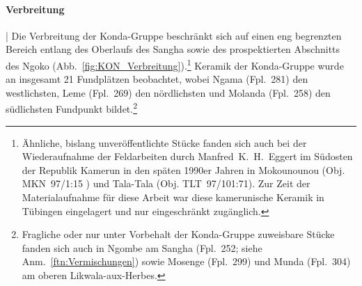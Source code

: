 \paragraph{Verbreitung}\hspace{-.5em}|\hspace{.5em}%
Die Verbreitung der Konda-Gruppe beschränkt sich auf einen eng begrenzten Bereich entlang des Oberlaufs des \mbox{Sangha} sowie des prospektierten Abschnitts des \mbox{Ngoko} (Abb.~\ref{fig:KON_Verbreitung}).\footnote{Ähnliche, bislang unveröffentlichte Stücke fanden sich auch bei der Wiederaufnahme der Feldarbeiten durch Manfred~K.~H.~Eggert im Südosten der Republik Kamerun in den späten 1990er Jahren \parencite[siehe][]{Eggert.2002} in Mokounounou (Obj. MKN~97/1:15 ) und Tala-Tala (Obj. TLT~97/101:71). Zur Zeit der Materialaufnahme für diese Arbeit war diese kamerunische Keramik in Tübingen eingelagert und nur eingeschränkt zugänglich.\label{ftn:SOKamerun1997Funde}} Keramik der Konda-Gruppe wurde an insgesamt 21 Fundplätzen beobachtet, wobei Ngama (Fpl.~281) den westlichsten, Leme (Fpl.~269) den nördlichsten und Molanda (Fpl.~258) den südlichsten Fundpunkt bildet.\footnote{Fragliche oder nur unter Vorbehalt der Konda-Gruppe zuweisbare Stücke fanden sich auch in Ngombe am \mbox{Sangha} (Fpl.~252; siehe Anm.~\ref{ftn:Vermischungen}) sowie Mosenge (Fpl.~299) und Munda (Fpl.~304) am oberen Likwala-aux-Herbes.}